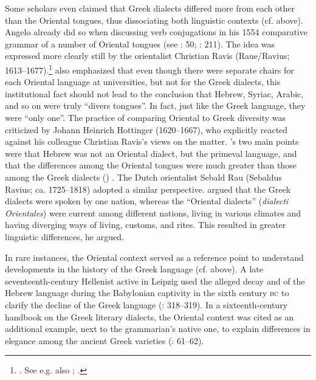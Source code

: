 Some scholars even claimed that Greek dialects differed more from each other than the Oriental tongues, thus dissociating both linguistic contexts (cf.  above). Angelo \citet[34]{Canini1554} already did so when discussing verb conjugations in his 1554 comparative grammar of a number of Oriental tongues (see \citealt{Contini1994}: 50; \citealt{Kessler-mesguich2013}: 211). The idea was expressed more clearly still by the orientalist Christian Ravis (Raue/Ravius; 1613–1677).\footnote{\citet[*.2\textsc{\textsuperscript{r}}]{Ravis1646}. See e.g. also \citet[51--52]{Hunt1739}; \citet[\textsc{xxvi}]{Groddeck1747}.} \citet[48]{Ravis1650} also emphasized that even though there were separate chairs for each Oriental language at universities, but not for the Greek dialects, this institutional fact should not lead to the conclusion that Hebrew, Syriac, Arabic, and so on were truly “divers tongues”. In fact, just like the Greek language, they were “only one”. The practice of comparing Oriental to Greek diversity was criticized by Johann Heinrich Hottinger (1620–1667), who explicitly reacted against his colleague Christian Ravis’s views on the matter. \citeauthor{Hottinger1661}'s two main points were that Hebrew was not an Oriental dialect, but the primeval language, and that the differences among the Oriental tongues were much greater than those among the Greek dialects (\citeyear[a.3\textsc{\textsuperscript{v}}–a.4\textsc{\textsuperscript{r}}]{Hottinger1661}) . The Dutch orientalist Sebald Rau (Sebaldus Ravius; ca. 1725–1818) adopted a similar perspective. \citet[20--21]{Rau1770} argued that the Greek dialects were spoken by one nation, whereas the “Oriental dialects” (\textit{dialecti Orientales}) were current among different nations, living in various climates and having diverging ways of living, customs, and rites. This resulted in greater linguistic differences, he argued.

In rare instances, the Oriental context served as a reference point to understand developments in the history of the Greek language (cf.  above). A late seventeenth-century Hellenist active in Leipzig used the alleged decay and  of the Hebrew language during the Babylonian captivity in the sixth century \textsc{bc} to clarify the decline of the Greek language (\citealt{Eling1691}: 318–319). In a sixteenth-century handbook on the Greek literary dialects, the Oriental context was cited as an additional example, next to the grammarian’s native one, to explain differences in elegance among the ancient Greek varieties (\citealt{Walper1589}: 61–62).

